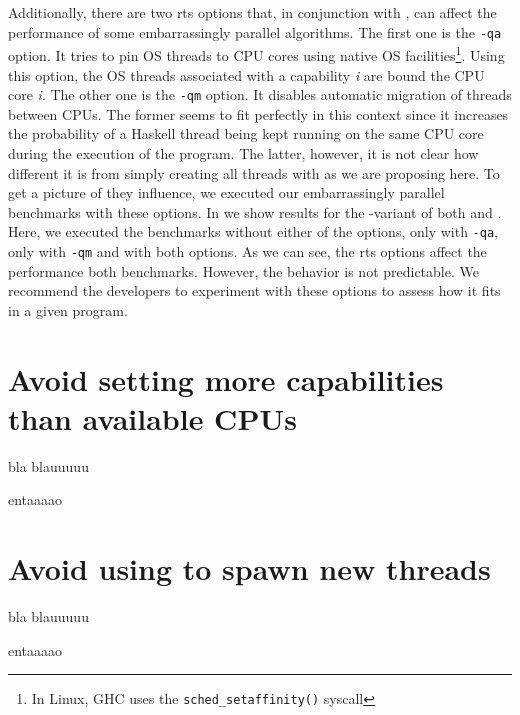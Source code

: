 Additionally, there are two \ac{rts} options that, in conjunction with \forkOn, can affect the performance of some embarrassingly parallel algorithms. The first one is the \texttt{-qa} option. It tries to pin OS threads to CPU cores using native OS facilities\footnote{In Linux, GHC uses the \texttt{sched\_setaffinity()} syscall}. Using this option, the OS threads associated with a capability \emph{i} are bound the CPU core \emph{i}. The other one is the \texttt{-qm} option. It disables automatic migration of threads between CPUs. The former seems to fit perfectly in this context since it increases the probability of a Haskell thread being kept running on the same CPU core during the execution of the program. The latter, however, it is not clear how different it is from simply creating all threads with \forkOn as we are proposing here. To get a picture of they influence, we executed our embarrassingly parallel benchmarks with these options. In  we show results for the \forkOn-\MVar variant of both \regex and \spectral. Here, we executed the benchmarks without either of the options, only with \texttt{-qa}, only with \texttt{-qm} and with both options. As we can see, the \ac{rts} options affect the performance both benchmarks. However, the behavior is not predictable. We recommend the developers to experiment with these options to assess how it fits in a given program.


\section{Avoid setting more capabilities than available CPUs}
 bla blauuuuu
\newline

 entaaaao


\section{Avoid using \forkOS to spawn new threads}
 bla blauuuuu
\newline

 entaaaao
